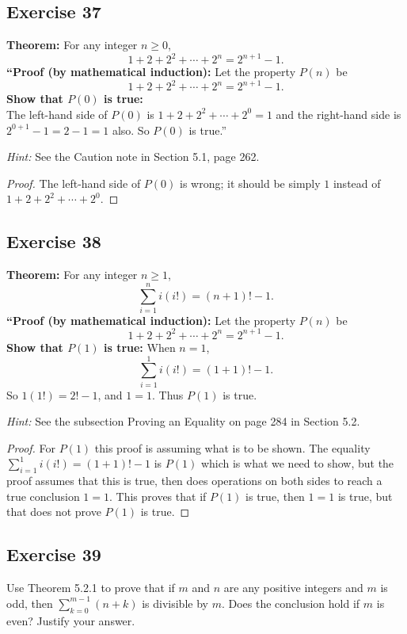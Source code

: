 \documentclass[14pt]{extarticle}
\newcommand{\dps}{\displaystyle}
\begin{document}
\subsection{Exercise 37}
{\bf Theorem:} For any integer $n \geq 0$,
\[
1 + 2 + 2^2 + \cdots + 2^n = 2^{n+1} - 1.
\]
{\bf ``Proof (by mathematical induction):} Let the property $P(n)$ be
\[
1 + 2 + 2^2 + \cdots + 2^n = 2^{n+1} - 1.
\]
{\bf Show that $P(0)$ is true:} \\
The left-hand side of $P(0)$ is $1 + 2 + 2^2 + \cdots + 2^0 = 1$ and the right-hand side is $2^{0+1} - 1 = 2 - 1 = 1$ also. So $P(0)$ is true.''

{\it Hint:} See the Caution note in Section 5.1, page 262.

\begin{proof}
The left-hand side of $P(0)$ is wrong; it should be simply $1$ instead of $1 + 2 + 2^2 + \cdots + 2^0$.
\end{proof}

\subsection{Exercise 38}
{\bf Theorem:} For any integer $n \geq 1$,
\[
\sum_{i=1}^{n}i(i!) = (n+1)! - 1.
\]
{\bf ``Proof (by mathematical induction):} Let the property $P(n)$ be
\[
1 + 2 + 2^2 + \cdots + 2^n = 2^{n+1} - 1.
\]
{\bf Show that $P(1)$ is true:} When $n = 1$,
\[
\sum_{i=1}^{1}i(i!) = (1+1)! - 1.
\]
So $1(1!) = 2! - 1$, and $1 = 1$. Thus $P(1)$ is true.

{\it Hint:} See the subsection Proving an Equality on page 284 in Section 5.2.

\begin{proof}
For $P(1)$ this proof is assuming what is to be shown. The equality \\ $\dps \sum_{i=1}^{1}i(i!) = (1+1)! - 1$ is $P(1)$ which is what we need to show, but the proof assumes that this is true, then does operations on both sides to reach a true conclusion $1 = 1$. This proves that if $P(1)$ is true, then $1 = 1$ is true, but that does not prove $P(1)$ is true.
\end{proof}

\subsection{Exercise 39}
Use Theorem 5.2.1 to prove that if $m$ and $n$ are any positive integers and $m$ is odd, then $\dps \sum_{k=0}^{m-1}(n+k)$ is divisible by $m$. Does the conclusion hold if $m$ is even? Justify your answer.
\end{document}
